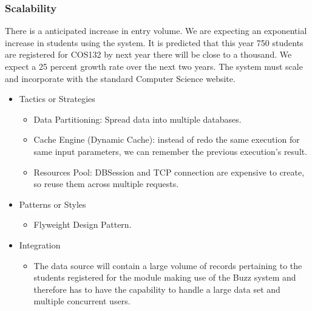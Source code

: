 
%

\subsubsection{Scalability}
		There is a anticipated increase in entry volume. We are expecting an exponential increase in students using the system. It is predicted that this year 750 students are registered for COS132 by next year there will be close to a thousand. We expect a 25 percent growth rate over the next two years. 			\cite{classRepMeeting}
		The system must scale and incorporate with the standard Computer Science website. 
		\begin{itemize}
			\item{Tactics or Strategies}
				\begin{itemize}
					\item Data Partitioning: Spread data into multiple databases.
					\item Cache Engine (Dynamic Cache): instead of redo the same execution for same input parameters, we can remember the previous execution's result.
					\item Resources Pool: DBSession and TCP connection are expensive to create, so reuse them across multiple requests.
				\end{itemize}
			\item{Patterns or Styles}
				\begin{itemize}
					\item Flyweight Design Pattern.
				\end{itemize}
			\item{Integration}
				\begin{itemize}
					\item The data source will contain a large volume of records pertaining to the students registered for the module making use of the Buzz system and therefore has to have the capability to handle a large data set and multiple concurrent users.
				\end{itemize}
		\end{itemize}
